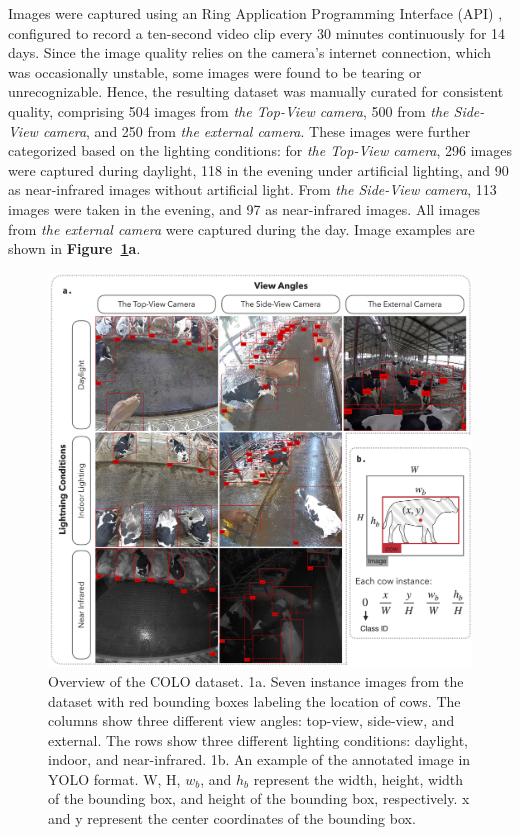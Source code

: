 Images were captured using an Ring Application Programming Interface (API) \citep{greif_dgreifring_2024}, configured to record a ten-second video clip every 30 minutes continuously for 14 days. Since the image quality relies on the camera's internet connection, which was occasionally unstable, some images were found to be tearing or unrecognizable. Hence, the resulting dataset was manually curated for consistent quality, comprising 504 images from \textit{the Top-View camera}, 500 from \textit{the Side-View camera}, and 250 from \textit{the external camera}. These images were further categorized based on the lighting conditions: for \textit{the Top-View camera}, 296 images were captured during daylight, 118 in the evening under artificial lighting, and 90 as near-infrared images without artificial light. From \textit{the Side-View camera}, 113 images were taken in the evening, and 97 as near-infrared images. All images from \textit{the external camera} were captured during the day. Image examples are shown in \textbf{Figure~\ref{fig:dataset}a}.

\begin{figure}[h]
    \centering
    \includegraphics[width=1\textwidth]{figure_1.jpg}
    \caption{Overview of the COLO dataset. 1a. Seven instance images from the dataset with red bounding boxes labeling the location of cows. The columns show three different view angles: top-view, side-view, and external. The rows show three different lighting conditions: daylight, indoor, and near-infrared. 1b. An example of the annotated image in YOLO format. W, H, $w_b$, and $h_b$ represent the width, height, width of the bounding box, and height of the bounding box, respectively. x and y represent the center coordinates of the bounding box.} 
    \label{fig:dataset}
\end{figure}

